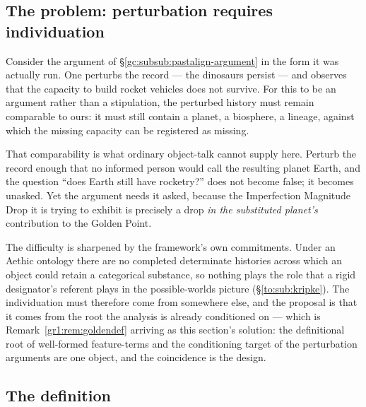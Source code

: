 \documentclass[11pt]{article}
\numberwithin{equation}{section}
\theoremstyle{plain}
\theoremstyle{definition}
\theoremstyle{remark}
\begin{document}
\subsection{The problem: perturbation requires individuation}
\label{to:sub:problem}

Consider the argument of \S\ref{gc:subsub:pastalign-argument} in the
form it was actually run. One perturbs the record --- the dinosaurs
persist --- and observes that the capacity to build rocket vehicles does
not survive. For this to be an argument rather than a stipulation, the
perturbed history must remain comparable to ours: it must still contain
a planet, a biosphere, a lineage, against which the missing capacity can
be registered as missing.

That comparability is what ordinary object-talk cannot supply here.
Perturb the record enough that no informed person would call the
resulting planet Earth, and the question ``does Earth still have
rocketry?'' does not become false; it becomes unasked. Yet the argument
needs it asked, because the Imperfection Magnitude Drop it is trying to
exhibit is precisely a drop \emph{in the substituted planet's}
contribution to the Golden Point.

The difficulty is sharpened by the framework's own commitments. Under an
Aethic ontology there are no completed determinate histories across
which an object could retain a categorical substance, so nothing plays
the role that a rigid designator's referent plays in the possible-worlds
picture (\S\ref{to:sub:kripke}). The individuation must therefore come
from somewhere else, and the proposal is that it comes from the root the
analysis is already conditioned on --- which is
Remark~\ref{gr1:rem:goldendef} arriving as this section's solution:
the definitional root of well-formed feature-terms and the
conditioning target of the perturbation arguments are one object, and
the coincidence is the design.

\subsection{The definition}\label{to:sub:definition}
\end{document}
